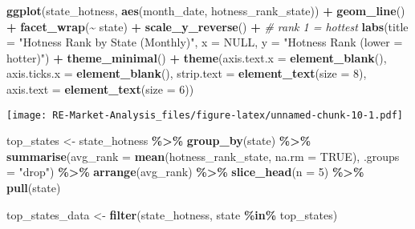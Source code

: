 \documentclass[
]{article}
\newenvironment{Shaded}{\begin{snugshade}}{\end{snugshade}}
\newcommand{\AttributeTok}[1]{\textcolor[rgb]{0.13,0.29,0.53}{#1}}
\newcommand{\CommentTok}[1]{\textcolor[rgb]{0.56,0.35,0.01}{\textit{#1}}}
\newcommand{\ConstantTok}[1]{\textcolor[rgb]{0.56,0.35,0.01}{#1}}
\newcommand{\DecValTok}[1]{\textcolor[rgb]{0.00,0.00,0.81}{#1}}
\newcommand{\FunctionTok}[1]{\textcolor[rgb]{0.13,0.29,0.53}{\textbf{#1}}}
\newcommand{\NormalTok}[1]{#1}
\newcommand{\OtherTok}[1]{\textcolor[rgb]{0.56,0.35,0.01}{#1}}
\newcommand{\SpecialCharTok}[1]{\textcolor[rgb]{0.81,0.36,0.00}{\textbf{#1}}}
\newcommand{\StringTok}[1]{\textcolor[rgb]{0.31,0.60,0.02}{#1}}
\begin{document}
\begin{Shaded}
\begin{Highlighting}[]
\FunctionTok{ggplot}\NormalTok{(state\_hotness, }\FunctionTok{aes}\NormalTok{(month\_date, hotness\_rank\_state)) }\SpecialCharTok{+}
  \FunctionTok{geom\_line}\NormalTok{() }\SpecialCharTok{+}
  \FunctionTok{facet\_wrap}\NormalTok{(}\SpecialCharTok{\textasciitilde{}}\NormalTok{ state) }\SpecialCharTok{+}
  \FunctionTok{scale\_y\_reverse}\NormalTok{() }\SpecialCharTok{+}  \CommentTok{\# rank 1 = hottest}
  \FunctionTok{labs}\NormalTok{(}\AttributeTok{title =} \StringTok{"Hotness Rank by State (Monthly)"}\NormalTok{,}
       \AttributeTok{x =} \ConstantTok{NULL}\NormalTok{, }\AttributeTok{y =} \StringTok{"Hotness Rank (lower = hotter)"}\NormalTok{) }\SpecialCharTok{+}
  \FunctionTok{theme\_minimal}\NormalTok{() }\SpecialCharTok{+}
  \FunctionTok{theme}\NormalTok{(}\AttributeTok{axis.text.x =} \FunctionTok{element\_blank}\NormalTok{(),}
        \AttributeTok{axis.ticks.x =} \FunctionTok{element\_blank}\NormalTok{(),}
        \AttributeTok{strip.text =} \FunctionTok{element\_text}\NormalTok{(}\AttributeTok{size =} \DecValTok{8}\NormalTok{),}
        \AttributeTok{axis.text =} \FunctionTok{element\_text}\NormalTok{(}\AttributeTok{size =} \DecValTok{6}\NormalTok{))}
\end{Highlighting}
\end{Shaded}

\texttt{[image: RE-Market-Analysis\_files/figure-latex/unnamed-chunk-10-1.pdf]}

\begin{Shaded}
\begin{Highlighting}[]
\NormalTok{top\_states }\OtherTok{\textless{}{-}}\NormalTok{ state\_hotness }\SpecialCharTok{\%\textgreater{}\%}
  \FunctionTok{group\_by}\NormalTok{(state) }\SpecialCharTok{\%\textgreater{}\%}
  \FunctionTok{summarise}\NormalTok{(}\AttributeTok{avg\_rank =} \FunctionTok{mean}\NormalTok{(hotness\_rank\_state, }\AttributeTok{na.rm =} \ConstantTok{TRUE}\NormalTok{), }\AttributeTok{.groups =} \StringTok{"drop"}\NormalTok{) }\SpecialCharTok{\%\textgreater{}\%}
  \FunctionTok{arrange}\NormalTok{(avg\_rank) }\SpecialCharTok{\%\textgreater{}\%}
  \FunctionTok{slice\_head}\NormalTok{(}\AttributeTok{n =} \DecValTok{5}\NormalTok{) }\SpecialCharTok{\%\textgreater{}\%}
  \FunctionTok{pull}\NormalTok{(state)}

\NormalTok{top\_states\_data }\OtherTok{\textless{}{-}} \FunctionTok{filter}\NormalTok{(state\_hotness, state }\SpecialCharTok{\%in\%}\NormalTok{ top\_states)}
\end{Highlighting}
\end{Shaded}
\end{document}
